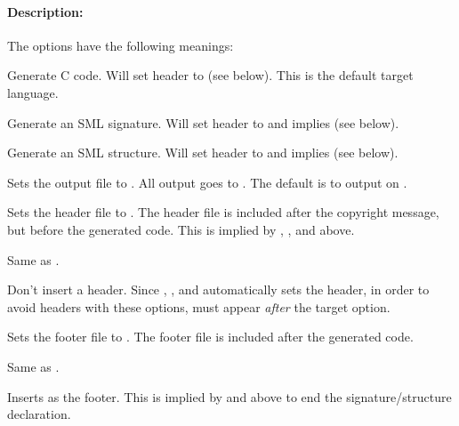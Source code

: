 \documentclass{article}
\begin{document}
\paragraph{Description:} The options have the following meanings:
\begin{description}
  
\item {} Generate C code. Will set header to
   (see  below). This is the
  default target language.
  
\item {} Generate an SML signature. Will set header to
   and implies  (see
   below).
  
\item {} Generate an SML structure. Will set header to
   and implies  (see
   below).
  
\item {} Sets the output file to
  .  All output goes to .  The default
  is to output on .
  
\item {} Sets the header file to
  . The header file is included after the copyright
  message, but before the generated code. This is implied by
  , , and  above.

\item {} Same as .
  
\item {} Don't insert a header. Since ,
  , and  automatically sets the header, in
  order to avoid headers with these options,  must
  appear \emph{after} the target option.
  
\item {} Sets the footer file to
  . The footer file is included after the generated
  code.

\item {} Same as .
  
\item {} Inserts  as the footer.  This is
  implied by  and  above to end the
  signature/structure declaration.


\end{description}
\end{document}
